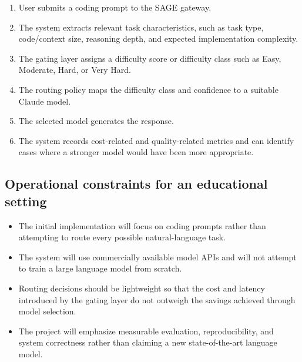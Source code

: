 \documentclass[11pt,a4paper]{article}
\begin{document}
\begin{enumerate}[leftmargin=0.7cm]

    \item User submits a coding prompt to the SAGE gateway.

    \item The system extracts relevant task characteristics,
    such as task type, code/context size, reasoning depth,
    and expected implementation complexity.

    \item The gating layer assigns a difficulty score or
    difficulty class such as Easy, Moderate, Hard, or
    Very Hard.

    \item The routing policy maps the difficulty class and
    confidence to a suitable Claude model.

    \item The selected model generates the response.

    \item The system records cost-related and quality-related
    metrics and can identify cases where a stronger model would
    have been more appropriate.

\end{enumerate}

\subsection{Operational constraints for an educational setting}

\begin{itemize}[leftmargin=0.7cm]

    \item The initial implementation will focus on coding
    prompts rather than attempting to route every possible
    natural-language task.

    \item The system will use commercially available model APIs
    and will not attempt to train a large language model from
    scratch.

    \item Routing decisions should be lightweight so that the
    cost and latency introduced by the gating layer do not
    outweigh the savings achieved through model selection.

    \item The project will emphasize measurable evaluation,
    reproducibility, and system correctness rather than
    claiming a new state-of-the-art language model.

\end{itemize}
\end{document}
